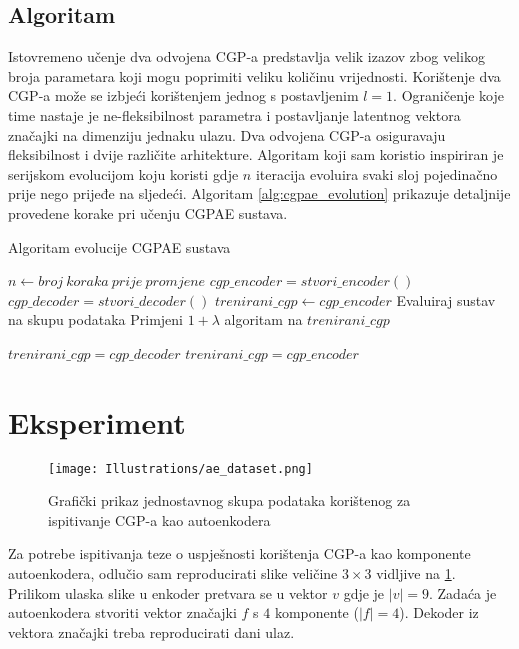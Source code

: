 \subsection{Algoritam}
Istovremeno učenje dva odvojena CGP-a predstavlja velik izazov zbog velikog broja parametara koji mogu poprimiti veliku količinu vrijednosti.
Korištenje dva CGP-a može se izbjeći korištenjem jednog s postavljenim $l = 1$.
Ograničenje koje time nastaje je ne-fleksibilnost parametra i postavljanje latentnog vektora značajki na dimenziju jednaku ulazu.
Dva odvojena CGP-a osiguravaju fleksibilnost i dvije različite arhitekture.
Algoritam koji sam koristio inspiriran je serijskom evolucijom koju koristi \cite{conv_gen_programming} gdje $n$ iteracija evoluira svaki sloj pojedinačno prije nego prijeđe na sljedeći.
Algoritam \ref{alg:cgpae_evolution} prikazuje detaljnije provedene korake pri učenju CGPAE sustava.

\begin{algorithm}
	\caption{Algoritam evolucije CGPAE sustava}
	\label{alg:cgpae_evolution}
	\begin{algorithmic}
		\STATE $n \leftarrow broj\ koraka\ prije\ promjene$
		\STATE $cgp\_encoder = stvori\_encoder()$
		\STATE $cgp\_decoder = stvori\_decoder()$
		\STATE $trenirani\_cgp \leftarrow cgp\_encoder$
			\STATE Evaluiraj sustav na skupu podataka
			\STATE Primjeni $1+\lambda$ algoritam na $trenirani\_cgp$

					\STATE $trenirani\_cgp = cgp\_decoder$
				\ELSE
					\STATE $trenirani\_cgp = cgp\_encoder$
				\ENDIF
			\ENDIF
		\ENDWHILE
	\end{algorithmic}
\end{algorithm}

\section{Eksperiment}

\begin{figure}[H]
	\centering
	\texttt{[image: Illustrations/ae\_dataset.png]}
	\caption{Grafički prikaz jednostavnog skupa podataka korištenog za ispitivanje CGP-a kao autoenkodera}
	\label{fig:ae_example}
\end{figure}

Za potrebe ispitivanja teze o uspješnosti korištenja CGP-a kao komponente autoenkodera, odlučio sam reproducirati slike veličine $3 \times 3$ vidljive na \ref{fig:ae_example}.
Prilikom ulaska slike u enkoder pretvara se u vektor $v$ gdje je $|v| = 9$.
Zadaća je autoenkodera stvoriti vektor značajki $f$ s $4$ komponente ($|f| = 4$).
Dekoder iz vektora značajki treba reproducirati dani ulaz.

